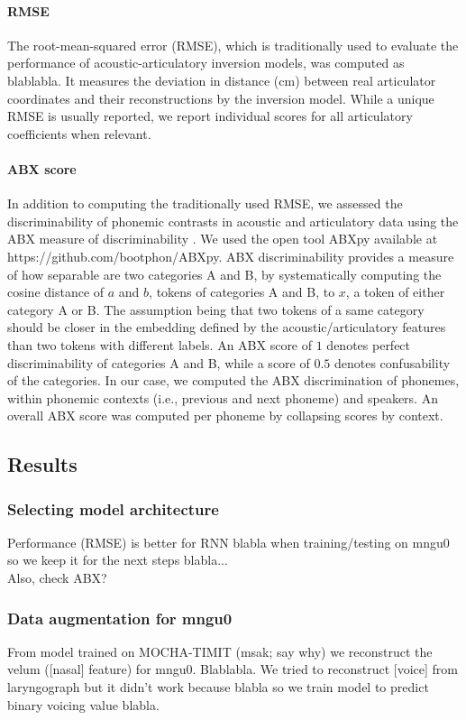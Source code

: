 \paragraph{RMSE}
The root-mean-squared error (RMSE), which is traditionally used to evaluate the performance of acoustic-articulatory inversion models, was computed as {\color{red}blablabla}. It measures the deviation in distance (cm) between real articulator coordinates and their reconstructions by the inversion model. While a unique RMSE is usually reported, we report individual scores for all articulatory coefficients when relevant.

\paragraph{ABX score}
In addition to computing the traditionally used RMSE, we assessed the discriminability of phonemic contrasts in acoustic and articulatory data using the ABX measure of discriminability {\color{red}\cite{}.} We used the open tool ABXpy available at https://github.com/bootphon/ABXpy. 
ABX discriminability provides a measure of how separable are two categories A and B, by systematically computing the cosine distance of $a$ and $b$, tokens of categories A and B, to $x$, a token of either category A or B. The assumption being that two tokens of a same category should be closer in the embedding defined by the acoustic/articulatory features than two tokens with different labels. 
An ABX score of $1$ denotes perfect discriminability of categories A and B, while a score of $0.5$ denotes confusability of the categories. 
In our case, we computed the ABX discrimination of phonemes, within phonemic contexts (i.e., previous and next phoneme) and speakers. An overall ABX score was computed per phoneme by collapsing scores by context.

\subsection{Results}
\subsubsection{Selecting model architecture}
{\color{red}Performance (RMSE) is better for RNN blabla when training/testing on mngu0 so we keep it for the next steps blabla... \\ Also, check ABX?}

\subsubsection{Data augmentation for mngu0}
{\color{red}From model trained on MOCHA-TIMIT (msak; say why) we reconstruct the velum ([nasal] feature) for mngu0. Blablabla. We tried to reconstruct [voice] from laryngograph but it didn't work because blabla so we train model to predict binary voicing value blabla.}

